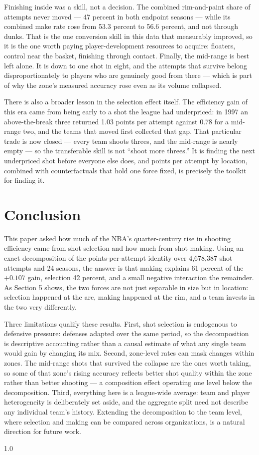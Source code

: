 \documentclass[12pt]{article}
\begin{document}
Finishing inside was a skill, not a decision. The combined rim-and-paint
share of attempts never moved --- 47 percent in both endpoint seasons ---
while its combined make rate rose from 53.3 percent to 56.6 percent, and not
through dunks. That is the one conversion skill in this data that measurably
improved, so it is the one worth paying player-development resources to
acquire: floaters, control near the basket, finishing through contact.
Finally, the mid-range is best left alone. It is down to one shot in eight,
and the attempts that survive belong disproportionately to players who are
genuinely good from there --- which is part of why the zone's measured
accuracy rose even as its volume collapsed.

There is also a broader lesson in the selection effect itself. The efficiency
gain of this era came from being early to a shot the league had underpriced:
in 1997 an above-the-break three returned 1.03 points per attempt against
0.78 for a mid-range two, and the teams that moved first collected that gap.
That particular trade is now closed --- every team shoots threes, and the
mid-range is nearly empty --- so the transferable skill is not ``shoot more
threes.'' It is finding the next underpriced shot before everyone else does,
and points per attempt by location, combined with counterfactuals that hold
one force fixed, is precisely the toolkit for finding it.

\section{Conclusion}

This paper asked how much of the NBA's quarter-century rise in shooting
efficiency came from shot selection and how much from shot making. Using an
exact decomposition of the points-per-attempt identity over 4,678,387 shot
attempts and 24 seasons, the answer is that making explains 61 percent of the
$+0.107$ gain, selection 42 percent, and a small negative interaction the
remainder. As Section 5 shows, the two forces are not just separable in size
but in location: selection happened at the arc, making happened at the rim,
and a team invests in the two very differently.

Three limitations qualify these results. First, shot selection is endogenous
to defensive pressure: defenses adapted over the same period, so the
decomposition is descriptive accounting rather than a causal estimate of what
any single team would gain by changing its mix. Second, zone-level rates can
mask changes within zones. The mid-range shots that survived the collapse are
the ones worth taking, so some of that zone's rising accuracy reflects better
shot quality within the zone rather than better shooting --- a composition
effect operating one level below the decomposition. Third, everything here is
a league-wide average: team and player heterogeneity is deliberately set
aside, and the aggregate split need not describe any individual team's
history. Extending the decomposition to the team level, where selection and
making can be compared across organizations, is a natural direction for
future work.


\begin{spacing}{1.0}

\end{spacing}
\end{document}
